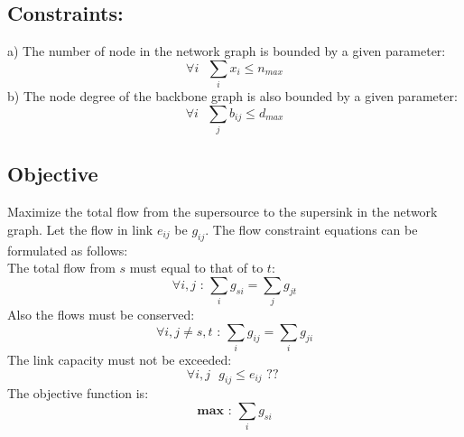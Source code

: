 \documentclass[letterpaper, 12pt]{article}
\begin{document}
\subsection*{Constraints:} a) The number of node in the network graph is bounded
by a given parameter:
\begin{equation}
	\forall i \mbox{ }\sum_i x_i \leq n_{max}
\end{equation}
b) The node degree of the backbone graph is also bounded by a given parameter:
\begin{equation}
	\forall i \mbox{ } \sum_j b_{ij}  \leq d_{max}
\end{equation}
\subsection*{Objective}
Maximize the total flow from the supersource to the supersink in the network
graph. Let the flow in link $e_{ij}$ be $g_{ij}$. The flow constraint equations
can be formulated as follows:\\
The total flow from $s$ must equal to that of to $t$:
\begin{equation}
	\forall i,j \mbox{ : } \sum_i g_{si} = \sum_j g_{jt}
\end{equation}
Also the flows must be conserved:
\begin{equation}
	\forall i,j \neq s,t \mbox{ : } \sum_i g_{ij} = \sum_i g_{ji}
\end{equation}
{\color{red}
The link capacity must not be exceeded:
\begin{equation}
	\forall i,j \mbox{ } g_{ij} \leq e_{ij} \mbox{ ?? }
\end{equation}
}
The objective function is:
\begin{equation}
	\mathbf{max} \mbox{ : }\sum_i g_{si}
\end{equation}
\end{document}
